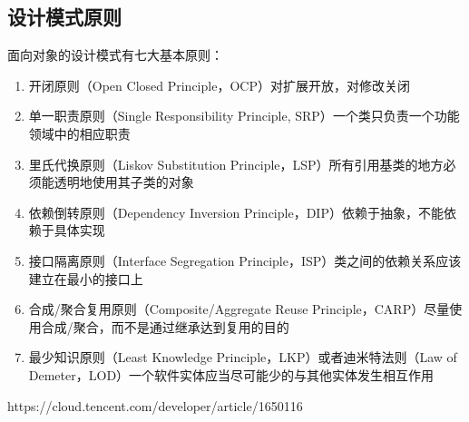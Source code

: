 \documentclass[../../../interview-questions.tex]{subfiles}
\begin{document}
\subsection{设计模式原则}

面向对象的设计模式有七大基本原则：

\begin{enumerate}
    \item {开闭原则（Open Closed Principle，OCP）}对扩展开放，对修改关闭
    \item {单一职责原则（Single Responsibility Principle, SRP）}一个类只负责一个功能领域中的相应职责
    \item {里氏代换原则（Liskov Substitution Principle，LSP）}所有引用基类的地方必须能透明地使用其子类的对象
    \item {依赖倒转原则（Dependency Inversion Principle，DIP）}依赖于抽象，不能依赖于具体实现
    \item {接口隔离原则（Interface Segregation Principle，ISP）}类之间的依赖关系应该建立在最小的接口上
    \item {合成/聚合复用原则（Composite/Aggregate Reuse Principle，CARP）}尽量使用合成/聚合，而不是通过继承达到复用的目的
    \item {最少知识原则（Least Knowledge Principle，LKP）或者迪米特法则（Law of  Demeter，LOD）}一个软件实体应当尽可能少的与其他实体发生相互作用
\end{enumerate}

https://cloud.tencent.com/developer/article/1650116
\end{document}
